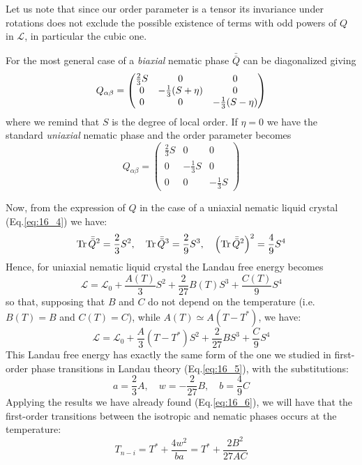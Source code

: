 \documentclass[../main/main.tex]{subfiles}
\begin{document}
Let us note that since our order parameter is a tensor its invariance under rotations does not exclude the possible existence of terms with odd powers of \( Q \) in \( \mathcal{L} \), in particular the cubic one.


For the most general case of a \emph{biaxial}  nematic phase \( \bar{\bar{Q} }  \) can be diagonalized giving
\begin{equation}
  Q_{\alpha \beta } =
  \begin{pmatrix}
  \frac{2}{3}S   & 0  & 0 \\
    0 &  - \frac{1}{3} \qty(S+ \eta  ) & 0 \\
    0 &  0 & - \frac{1}{3}\qty(S- \eta  )
  \end{pmatrix}
\end{equation}
where we remind that \( S \) is the degree of local order.
If \( \eta = 0 \) we have the standard \emph{uniaxial} nematic phase and the order parameter becomes
\begin{equation}
  Q_{\alpha \beta } =
  \begin{pmatrix}
  \frac{2}{3}S   & 0  & 0 \\
    0 &  - \frac{1}{3}S & 0 \\
    0 &  0 & - \frac{1}{3}S
  \end{pmatrix}
  \label{eq:16_4}
\end{equation}

Now, from the expression of \( Q \) in the case of a uniaxial nematic liquid crystal (Eq.\eqref{eq:16_4}) we have:
\begin{equation*}
 \Tr \bar{\bar{Q} }^2  = \frac{2}{3} S^2, \quad \Tr \bar{\bar{Q} }^3  = \frac{2}{9} S^3, \quad \qty(\Tr \bar{\bar{Q} }^2)^2  = \frac{4}{9} S^4
\end{equation*}
Hence, for uniaxial nematic liquid crystal the Landau free energy becomes
\begin{equation}
  \mathcal{L} = \mathcal{L}_0 +  \frac{A(T)} {3}S^2 + \frac{2}{27} B(T) S^3 + \frac{C(T)}{9}  S^4
\end{equation}
so that, supposing that \( B \) and \( C \) do not depend on the temperature (i.e. \( B(T) =B \) and \( C(T) = C \)), while  \( A(T) \simeq A (T-T^*) \), we have:
\begin{equation}
  \mathcal{L} = \mathcal{L}_0 + \frac{A}{3} (T-T^*) S^2 + \frac{2}{27} B S^3 + \frac{C}{9} S^4
\end{equation}
This Landau free energy has exactly the same form of the one we studied in first-order phase transitions in Landau theory (Eq.\eqref{eq:16_5}), with the substitutions:
\begin{equation*}
  a = \frac{2}{3} A, \quad w = -\frac{2}{27} B, \quad b = \frac{4}{9} C
\end{equation*}
Applying the results we have already found  (Eq.\eqref{eq:16_6}), we will have that the first-order transitions between the isotropic and nematic phases occurs at the temperature:
\begin{equation}
  T_{n-i} =  T^* + \frac{4w^2}{ba}=  T^* + \frac{2 B^2}{27 A C}
\end{equation}
\end{document}
